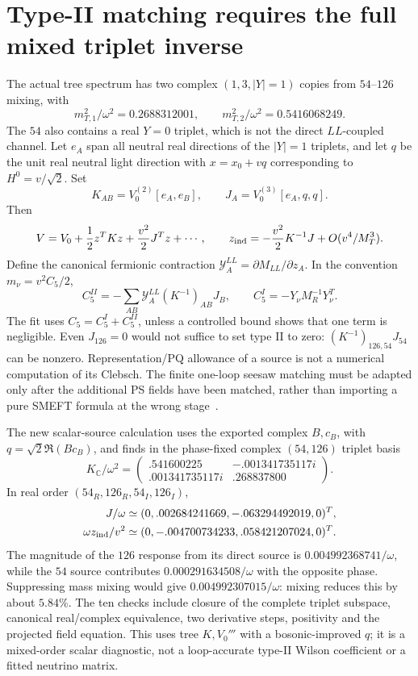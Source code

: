 \documentclass[11pt]{article}
\begin{document}
\section{Type-II matching requires the full mixed triplet inverse}
The actual tree spectrum has two complex $(1,3,|Y|=1)$ copies from
$54$--$126$ mixing, with
\[
m_{T,1}^2/\omega^2=0.2688312001,\qquad
m_{T,2}^2/\omega^2=0.5416068249.
\]
The $54$ also contains a real $Y=0$ triplet, which is not the direct
$LL$-coupled channel. Let $e_A$ span all neutral real directions of the
$|Y|=1$ triplets, and let $q$ be the unit real neutral light direction
with $x=x_0+v q$ corresponding to $H^0=v/\sqrt2$. Set
\begin{equation}
 K_{AB}=V_0^{(2)}[e_A,e_B],\qquad J_A=V_0^{(3)}[e_A,q,q].
\end{equation}
Then
\begin{equation}
 V=V_0+\frac12z^TKz+\frac{v^2}{2}J^Tz+\cdots,
 \qquad z_{\rm ind}=-\frac{v^2}{2}K^{-1}J+O(v^4/M_T^3).
\end{equation}
Define the canonical fermionic contraction
$\mathcal Y_A^{LL}=\partial M_{LL}/\partial z_A$. In the convention
$m_\nu=v^2C_5/2$,
\begin{equation}
 \boxed{C_5^{II}=-\sum_{AB}\mathcal Y_A^{LL}(K^{-1})_{AB}J_B,
 \qquad C_5^I=-Y_\nu M_R^{-1}Y_\nu^T.}
\label{eq:typeII}
\end{equation}
The fit uses $C_5=C_5^I+C_5^{II}$, unless a controlled bound shows that one
term is negligible. Even $J_{126}=0$ would not suffice to set type II to
zero: $(K^{-1})_{126,54}J_{54}$ can be nonzero. Representation/PQ
allowance of a source is not a numerical computation of its Clebsch.
The finite one-loop seesaw matching must be adapted only after the
additional PS fields have been matched, rather than importing a pure
SMEFT formula at the wrong stage~\cite{typeI,typeII}.

The new scalar-source calculation uses the exported complex $B,c_B$,
with $q=\sqrt2\Re(Bc_B)$, and finds in the phase-fixed complex
$(54,126)$ triplet basis
\begin{equation}
 K_{\mathbb C}/\omega^2=\begin{pmatrix}
 .541600225&-.001341735117i\\ .001341735117i&.268837800
 \end{pmatrix}.
\end{equation}
In real order $(54_R,126_R,54_I,126_I)$,
\begin{align}
 J/\omega&\simeq(0,.002684241669,-.063294492019,0)^T,\\
 \omega z_{\rm ind}/v^2&\simeq(0,-.004700734233,.058421207024,0)^T.
\end{align}
The magnitude of the $126$ response from its direct source is
$0.004992368741/\omega$, while the $54$ source contributes
$0.000291634508/\omega$ with the opposite phase. Suppressing mass mixing
would give $0.004992307015/\omega$: mixing reduces this by about $5.84\%$.
The ten checks include closure of the complete triplet subspace, canonical
real/complex equivalence, two derivative steps, positivity and the
projected field equation. This uses tree $K,V_0'''$ with a
bosonic-improved $q$; it is a mixed-order scalar diagnostic, not a
loop-accurate type-II Wilson coefficient or a fitted neutrino matrix.
\end{document}
